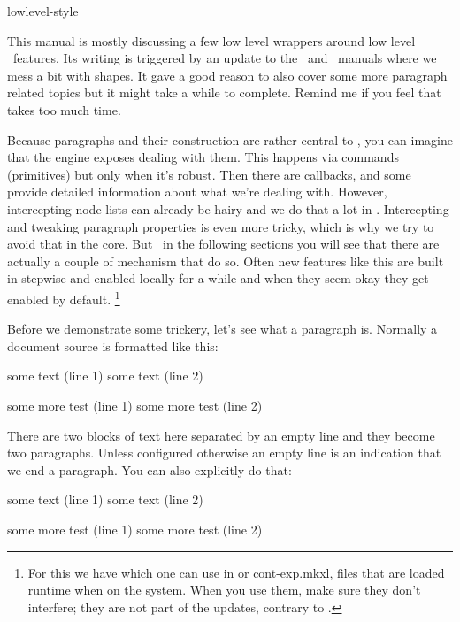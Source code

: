 
\environment lowlevel-style

\startdocument
  [title=paragraphs,
   color=middlecyan]

\startsection[title=Introduction]

This manual is mostly discussing a few low level wrappers around low level \TEX\
features. Its writing is triggered by an update to the \METAFUN\ and \LUAMETAFUN\
manuals where we mess a bit with shapes. It gave a good reason to also cover some
more paragraph related topics but it might take a while to complete. Remind me if
you feel that takes too much time.

Because paragraphs and their construction are rather central to \TEX, you can
imagine that the engine exposes dealing with them. This happens via commands
(primitives) but only when it's robust. Then there are callbacks, and some
provide detailed information about what we're dealing with. However, intercepting
node lists can already be hairy and we do that a lot in \CONTEXT. Intercepting
and tweaking paragraph properties is even more tricky, which is why we try to
avoid that in the core. But \unknown\ in the following sections you will see that
there are actually a couple of mechanism that do so. Often new features like this
are built in stepwise and enabled locally for a while and when they seem okay
they get enabled by default. \footnote {For this we have \type
{\enableexperiments} which one can use in \type {cont-loc.mkxl} or \type
{cont-exp.mkxl}, files that are loaded runtime when on the system. When you use
them, make sure they don't interfere; they are not part of the updates, contrary
to \type {cont-new.mkxl}.}

\stopsection

\startsection[title=Paragraphs]

Before we demonstrate some trickery, let's see what a paragraph is. Normally a
document source is formatted like this:

\starttyping[option=TEX]
some text (line 1)
some text (line 2)

some more test (line 1)
some more test (line 2)
\stoptyping

There are two blocks of text here separated by an empty line and they become two
paragraphs. Unless configured otherwise an empty line is an indication that we
end a paragraph. You can also explicitly do that:

\starttyping[option=TEX]
some text (line 1)
some text (line 2)
\par
some more test (line 1)
some more test (line 2)
\stoptyping

